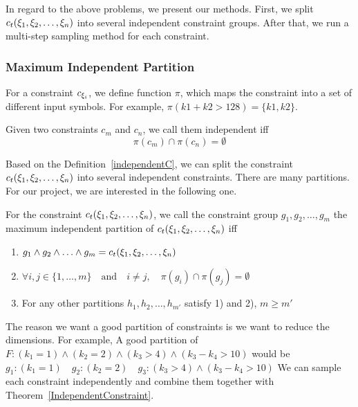 In regard to the above problems, we present our methods. First, we split
$c_t({\xi}_{1},{\xi}_{2},\ldots,{\xi}_{n})$ into several independent constraint
groups. After that, we run a multi-step sampling method for each constraint.

\subsubsection{Maximum Independent Partition}

For a constraint $c_{{\xi}_{i}}$, we define function $\pi$, which maps the
constraint into a set of different input symbols. For example, $\pi(k1 + k2 >
128) = \{k1, k2\}$.

\begin{mydef}[]
      \label{independentC}
      Given two constraints $c_m$ and $c_n$, we call them independent iff
      $$\pi(c_m) \cap \pi(c_n) = \emptyset$$
\end{mydef}

Based on the Definition~\ref{independentC}, we can split the constraint
$c_t({\xi}_{1},{\xi}_{2},\ldots,{\xi}_{n})$ into several independent constraints.
There are many partitions. For our project, we are interested in the following
one.

\begin{mydef}\label{Goodpartition}
      For the constraint $c_t({\xi}_{1},{\xi}_{2},\ldots,{\xi}_{n})$,
      we call the constraint group
      $g_{1}, g_{2}, \ldots, g_{m}$
      the maximum independent partition of $c_t({\xi}_{1},{\xi}_{2},\ldots,{\xi}_{n})$ iff
      \begin{enumerate}
            \item $g_{1} \land g_{2} \land \ldots \land g_{m} = c_t({\xi}_{1},{\xi}_{2},\ldots,{\xi}_{n})$
            \item $\forall i, j \in \{1, \ldots, m\} \quad \textrm{and} \quad
                        i \neq j,\quad\pi(g_{i}) \cap \pi(g_{j}) = \emptyset $
            \item For any other partitions  $h_{1}, h_{2}, \ldots, h_{m'}$ satisfy 1) and
                  2), $m \geq m'$
      \end{enumerate}

\end{mydef}

The reason we want a good partition of constraints is we want to reduce
the dimensions. For example,
A good partition of $F: ({k_1} = 1)\land({k_2} = 2)\land({k_3} > 4)\land({k_3} - {k_4} > 10)$ would be
$g_{1}: ({k_1} = 1)\quad g_{2}: ({k_2} = 2)\quad g_{3}: ({k_3} > 4) \land
({k_3} - {k_4} > 10)$  
We can sample each constraint independently and combine them together
with Theorem~\ref{IndependentConstraint}.

